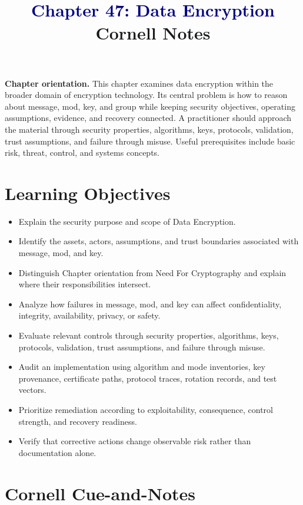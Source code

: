 \documentclass[11pt]{article}
\title{\textcolor{Navy}{Chapter 47: Data Encryption}\\[2mm]\large Cornell Notes}
\author{}
\date{}
\begin{document}
\maketitle
\thispagestyle{fancy}
\vspace{-1.5em}
\begin{orientationbox}
\textbf{Chapter orientation.} This chapter examines data encryption within the broader domain of encryption technology. Its central problem is how to reason about message, mod, key, and group while keeping security objectives, operating assumptions, evidence, and recovery connected. A practitioner should approach the material through security properties, algorithms, keys, protocols, validation, trust assumptions, and failure through misuse. Useful prerequisites include basic risk, threat, control, and systems concepts.
\end{orientationbox}
\section*{Learning Objectives}
\begin{itemize}
\item Explain the security purpose and scope of Data Encryption.
\item Identify the assets, actors, assumptions, and trust boundaries associated with message, mod, and key.
\item Distinguish Chapter orientation from Need For Cryptography and explain where their responsibilities intersect.
\item Analyze how failures in message, mod, and key can affect confidentiality, integrity, availability, privacy, or safety.
\item Evaluate relevant controls through security properties, algorithms, keys, protocols, validation, trust assumptions, and failure through misuse.
\item Audit an implementation using algorithm and mode inventories, key provenance, certificate paths, protocol traces, rotation records, and test vectors.
\item Prioritize remediation according to exploitability, consequence, control strength, and recovery readiness.
\item Verify that corrective actions change observable risk rather than documentation alone.
\end{itemize}
\section*{Cornell Cue-and-Notes}
\end{document}
